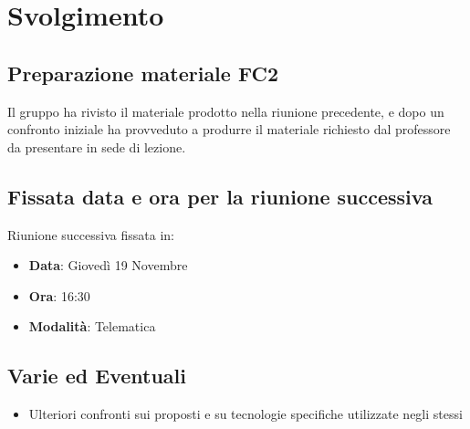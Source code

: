 \documentclass[]{article}
\begin{document}
	\section{Svolgimento}
		\subsection{Preparazione materiale FC2}
		Il gruppo ha rivisto il materiale prodotto nella riunione precedente, e dopo un confronto iniziale ha provveduto a produrre il materiale richiesto dal professore da presentare in sede di lezione.
		 
		\subsection{Fissata data e ora per la riunione successiva}
		Riunione successiva fissata in:
		\begin{itemize}
			\item \textbf{Data}: Giovedì 19 Novembre
			\item \textbf{Ora}: 16:30
			\item \textbf{Modalità}: Telematica
		\end{itemize}
		
		\subsection{Varie ed Eventuali}
		\begin{itemize}
			\item Ulteriori confronti sui  proposti e su tecnologie specifiche utilizzate negli stessi
		\end{itemize}
  
\end{document}

